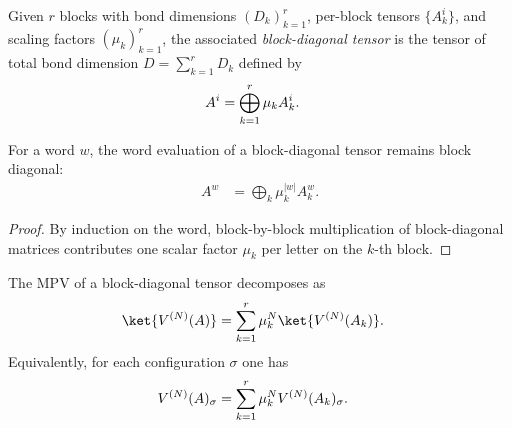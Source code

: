 \begin{definition}\label{def:block_diagonal_tensor}
    \leanok
    Given $r$ blocks with bond dimensions $(D_k)_{k=1}^r$,
    per-block tensors $\{A_k^i\}$,
    and scaling factors $(\mu_k)_{k=1}^r$,
    the associated \emph{block-diagonal tensor} is the tensor of
    total bond dimension $D = \sum_{k=1}^r D_k$ defined by
    \begin{align}
        A^i
         & = \bigoplus_{k=1}^{r} \mu_k A_k^i.
        \notag
    \end{align}
\end{definition}

\begin{lemma}
    \label{lem:eval_word_block_diagonal_tensor}
    \leanok
    For a word $w$, the word evaluation of a block-diagonal tensor remains
    block diagonal:
    \begin{align}
        A^w
         & = \bigoplus_k \mu_k^{|w|} A_k^w.
        \label{eq:mps_block_word_eval}
    \end{align}
\end{lemma}

\begin{proof}\leanok
    By induction on the word, block-by-block multiplication of block-diagonal
    matrices contributes one scalar factor $\mu_k$ per letter on the $k$-th
    block.
\end{proof}

\begin{theorem}\label{thm:mpv_decomposition}
    \leanok
    The MPV of a block-diagonal tensor decomposes as
    \begin{align}
        \ket{V^{(N)}(A)}
         & = \sum_{k=1}^{r} \mu_k^N \ket{V^{(N)}(A_k)}.
        \label{eq:mps_mpv_decomposition}
    \end{align}
    Equivalently, for each configuration $\sigma$ one has
    \begin{align}
        V^{(N)}(A)_\sigma
         & = \sum_{k=1}^{r} \mu_k^N V^{(N)}(A_k)_\sigma.
        \notag
    \end{align}
\end{theorem}


